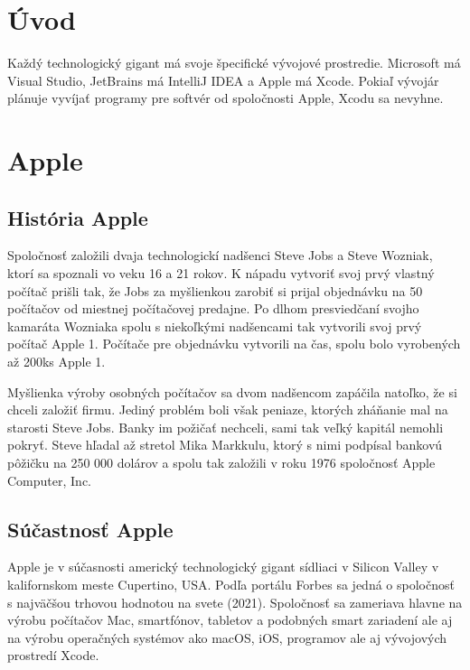 \documentclass[12pt]{article}
\begin{document}
	\newpage
		\renewcommand*\contentsname{Obsah}
		\tableofcontents

	\newpage
		\section{Úvod}
			Každý technologický gigant má svoje špecifické vývojové prostredie.  Microsoft má Visual Studio,  JetBrains má IntelliJ IDEA a Apple má Xcode.  Pokiaľ vývojár plánuje vyvíjať programy pre softvér od spoločnosti Apple,  Xcodu sa nevyhne. \par

	\newpage
		\section{Apple}
		\subsection{História Apple}
			Spoločnosť založili dvaja technologickí nadšenci Steve Jobs a Steve Wozniak,  ktorí sa spoznali vo veku 16 a 21 rokov.  K nápadu vytvoriť svoj prvý vlastný počítač prišli tak,  že Jobs za myšlienkou zarobiť si prijal objednávku na 50 počítačov od miestnej počítačovej predajne.  Po dlhom presviedčaní svojho kamaráta Wozniaka spolu s niekoľkými nadšencami tak vytvorili svoj prvý počítač Apple 1.  Počítače pre objednávku vytvorili na čas,  spolu bolo vyrobených až 200ks Apple 1. \cite{applewiki} \par
			Myšlienka výroby osobných počítačov sa dvom nadšencom zapáčila natoľko,  že si chceli založiť firmu.  Jediný problém boli však peniaze,  ktorých zháňanie mal na starosti Steve Jobs.  Banky im požičať nechceli,  sami tak veľký kapitál nemohli pokryť.  Steve hľadal až stretol Mika Markkulu,  ktorý s nimi podpísal bankovú pôžičku na 250 000 dolárov a spolu tak založili v roku 1976 spoločnosť Apple Computer, Inc.  \cite{applewiki}

		\subsection{Súčastnosť Apple}
			Apple je v súčasnosti americký technologický gigant sídliaci v Silicon Valley v kalifornskom meste Cupertino,  USA.  Podľa portálu Forbes sa jedná o spoločnosť s najväčšou trhovou hodnotou na svete (2021).  Spoločnosť sa zameriava hlavne na výrobu počítačov Mac,  smartfónov,  tabletov a podobných smart zariadení ale aj na výrobu operačných systémov ako macOS,  iOS,  programov ale aj vývojových prostredí Xcode. \cite{applewiki}
\end{document}
